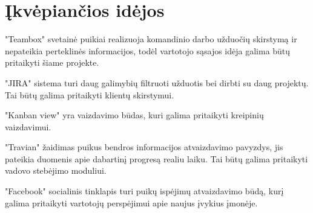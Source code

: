 \section{Įkvėpiančios idėjos}

"Teambox" svetainė puikiai realizuoja komandinio darbo užduočių skirstymą ir nepateikia perteklinės informacijos, todėl vartotojo sąsajos idėja galima būtų pritaikyti šiame projekte.

"JIRA" sistema turi daug galimybių filtruoti užduotis bei dirbti su daug projektų. Tai būtų galima pritaikyti klientų skirstymui.

"Kanban view" yra vaizdavimo būdas, kuri galima pritaikyti kreipinių vaizdavimui.

"Travian" žaidimas puikus bendros informacijos atvaizdavimo pavyzdys, jis pateikia duomenis apie dabartinį progresą realiu laiku. Tai būtų galima pritaikyti vadovo stebėjimo moduliui.

"Facebook" socialinis tinklapis turi puikų ispėjimų atvaizdavimo būdą, kurį galima pritaikyti vartotojų perspėjimui apie naujus įvykius įmonėje.

	
